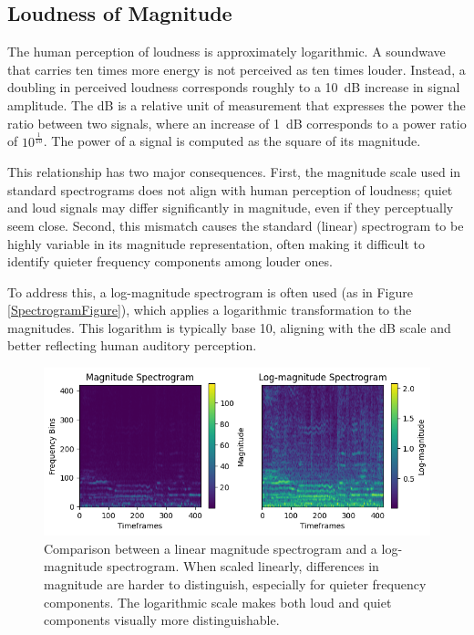 \subsection{Loudness of Magnitude}

The human perception of loudness is approximately logarithmic. A soundwave that carries ten times more energy is not perceived as ten times louder. Instead, a doubling in perceived loudness corresponds roughly to a 10~\gls{dB} increase in signal amplitude. The \acrlong{dB} is a relative unit of measurement that expresses the power the ratio between two signals, where an increase of 1~\gls{dB} corresponds to a power ratio of $10^\frac{1}{10}$. The power of a signal is computed as the square of its magnitude. 

This relationship has two major consequences. First, the magnitude scale used in standard spectrograms does not align with human perception of loudness; quiet and loud signals may differ significantly in magnitude, even if they perceptually seem close. Second, this mismatch causes the standard (linear) spectrogram to be highly variable in its magnitude representation, often making it difficult to identify quieter frequency components among louder ones.

To address this, a log-magnitude spectrogram is often used (as in Figure \ref{SpectrogramFigure}), which applies a logarithmic transformation to the magnitudes. This logarithm is typically base 10, aligning with the \acrlong{dB} scale and better reflecting human auditory perception.

\begin{figure}[H]
    \centering
    \hspace*{-1.0cm}
    \includegraphics[scale=1.0]{figures/spectrogramlogspectrogram}
    \caption{Comparison between a linear magnitude spectrogram and a log-magnitude spectrogram. When scaled linearly, differences in magnitude are harder to distinguish, especially for quieter frequency components. The logarithmic scale makes both loud and quiet components visually more distinguishable.}
    \label{SpectrogramLogspectrogramFigure}
\end{figure}

